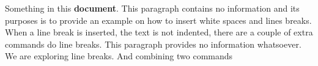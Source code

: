 \documentclass{article}
\begin{document}
Something in this \textbf{document}. This paragraph contains no information
and its purposes is to provide an example on how to insert white
spaces and lines breaks.\\
When a line break is inserted, the text is not indented, there
are a couple of extra commands do line breaks. \newline
This paragraph provides no information whatsoever. We are exploring
line breaks. \hfill \break
And combining two commands
\end{document}
